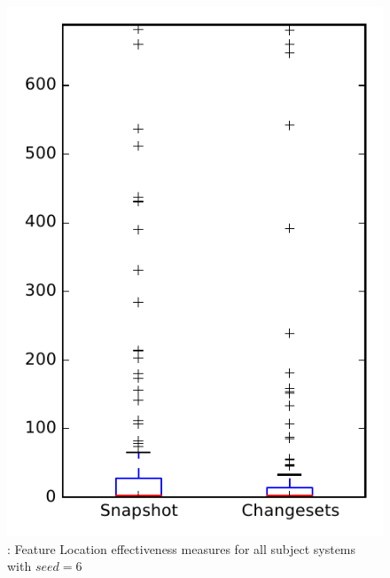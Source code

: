 
\begin{figure}
\centering
\includegraphics[height=0.4\textheight]{figures/flt_seed/rq1_overview_6}
\caption{\rone: Feature Location effectiveness measures for all subject systems with $seed=6$}
\label{fig:flt_seed:rq1:overview}
\end{figure}
